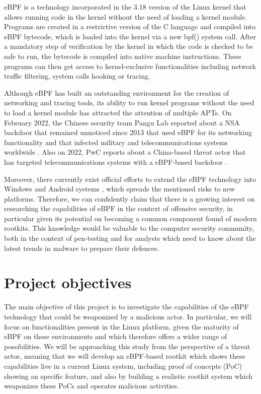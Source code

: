 eBPF is a technology incorporated in the 3.18 version of the Linux kernel
\cite{ebpf_linux318} that allows running code in the kernel without the need of loading a kernel module. Programs are created in a restrictive version of the C language and compiled into eBPF bytecode, which is loaded into the kernel via a new bpf() system call. After a mandatory step of verification by the kernel in which the code is checked to be safe to run, the bytecode is compiled into native machine instructions. These programs can then get access to kernel-exclusive functionalities including network traffic filtering, system calls hooking or tracing.

Although eBPF has built an outstanding environment for the creation of networking and tracing tools, its ability to run kernel programs without the need to load a kernel module has attracted the attention of multiple APTs. On February 2022, the Chinese security team Pangu Lab reported about a NSA backdoor that remained unnoticed since 2013 that used eBPF for its networking functionality and that infected military and telecommunications systems worldwide \cite{bvp47_report}. Also on 2022, PwC reports about a China-based threat actor that has targeted telecommunications systems with a eBPF-based backdoor \cite{bpfdoor_pwc}.

Moreover, there currently exist official efforts to extend the eBPF technology into Windows \cite{ebpf_windows} and Android systems \cite{ebpf_android}, which spreads the mentioned risks to new platforms. Therefore, we can confidently claim that there is a growing interest on researching the capabilities of eBPF in the context of offensive security, in particular given its potential on becoming a common component found of modern rootkits. This knowledge would be valuable to the computer security community, both in the context of pen-testing and for analysts which need to know about the latest trends in malware to prepare their defences.


\section{Project objectives} \label{section:project_objectives}
The main objective of this project is to investigate the capabilities of
the eBPF technology that could be weaponized by a malicious actor. In
particular, we will focus on functionalities present in the Linux platform, given the maturity of eBPF on these environments and which therefore offers a wider range of possibilities. We will be approaching this study from the perspective of a threat actor, meaning that we will develop an eBPF-based rootkit which shows these capabilities live in a current Linux system, including proof of concepts (PoC) showing an specific feature, and also by building a realistic rootkit system which weaponizes these PoCs and operates malicious activities. 

